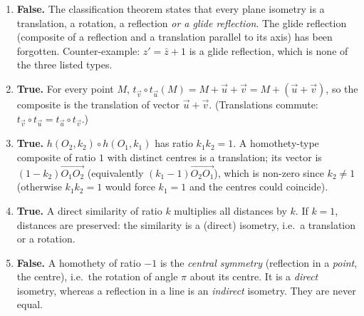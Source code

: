 \documentclass[11pt]{article}
\begin{document}
\begin{corrige}
\begin{enumerate}
\item \textbf{False.} The classification theorem states that every plane isometry is a translation, a rotation, a reflection \emph{or a glide reflection}. The glide reflection (composite of a reflection and a translation parallel to its axis) has been forgotten. Counter-example: $z' = \bar{z} + 1$ is a glide reflection, which is none of the three listed types.
\item \textbf{True.} For every point $M$, $t_{\vec{v}}\circ t_{\vec{u}}(M) = M + \vec{u} + \vec{v} = M + (\vec{u}+\vec{v})$, so the composite is the translation of vector $\vec{u}+\vec{v}$. (Translations commute: $t_{\vec{v}}\circ t_{\vec{u}} = t_{\vec{u}}\circ t_{\vec{v}}$.)
\item \textbf{True.} $h(O_2,k_2)\circ h(O_1,k_1)$ has ratio $k_1k_2 = 1$. A homothety-type composite of ratio $1$ with distinct centres is a translation; its vector is $(1-k_2)\overrightarrow{O_1O_2}$ (equivalently $(k_1-1)\overrightarrow{O_2O_1}$), which is non-zero since $k_2 \neq 1$ (otherwise $k_1k_2=1$ would force $k_1=1$ and the centres could coincide).
\item \textbf{True.} A direct similarity of ratio $k$ multiplies all distances by $k$. If $k = 1$, distances are preserved: the similarity is a (direct) isometry, i.e.\ a translation or a rotation.
\item \textbf{False.} A homothety of ratio $-1$ is the \emph{central symmetry} (reflection in a \emph{point}, the centre), i.e.\ the rotation of angle $\pi$ about its centre. It is a \emph{direct} isometry, whereas a reflection in a line is an \emph{indirect} isometry. They are never equal.
\end{enumerate}
\end{corrige}
\end{document}
